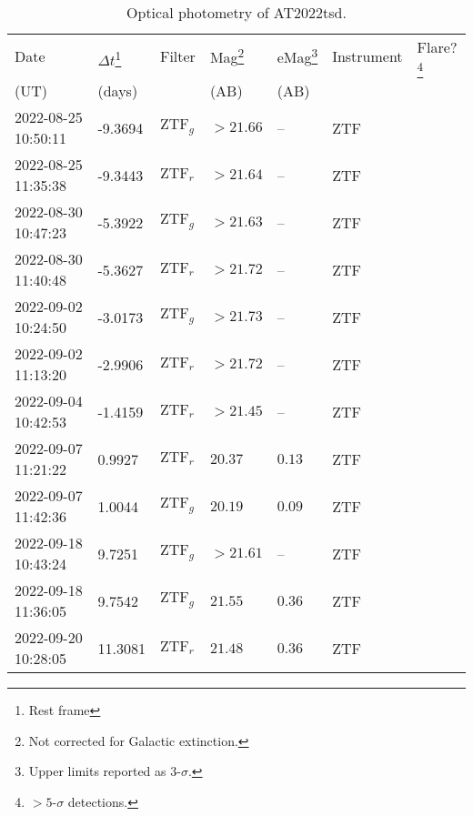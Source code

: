 \documentclass{nature_plusfigure}
\begin{document}
\begin{supplement}

\renewcommand{\thefigure}{Supplementary Information Figure~\arabic{figure}}
\renewcommand{\figurename}{}
\setcounter{figure}{0}
%


\renewcommand{\thetable}{Supplementary Information Table~\arabic{table}}
 \renewcommand{\tablename}{}
\setcounter{table}{0}

\begin{center} 
\begin{longtable}{lllllll} 
\caption{Optical photometry of AT2022tsd.} 
\label{tab:optical-photometry}\\ 
\hline\hline
Date & $\Delta t$\footnote{Rest frame} & Filter & Mag\footnote{Not corrected for Galactic extinction.} & eMag\footnote{Upper limits reported as 3-$\sigma$.} & Instrument & Flare?\footnote{$>5$-$\sigma$ detections.}\\ 
(UT) & (days) &  & (AB) & (AB) &  & \\ 
\hline
2022-08-25 10:50:11 & -9.3694 & $\mathrm{ZTF}_{g}$ & $>21.66$ & -- & ZTF &  \\ 
2022-08-25 11:35:38 & -9.3443 & $\mathrm{ZTF}_{r}$ & $>21.64$ & -- & ZTF &  \\ 
2022-08-30 10:47:23 & -5.3922 & $\mathrm{ZTF}_{g}$ & $>21.63$ & -- & ZTF &  \\ 
2022-08-30 11:40:48 & -5.3627 & $\mathrm{ZTF}_{r}$ & $>21.72$ & -- & ZTF &  \\ 
2022-09-02 10:24:50 & -3.0173 & $\mathrm{ZTF}_{g}$ & $>21.73$ & -- & ZTF &  \\ 
2022-09-02 11:13:20 & -2.9906 & $\mathrm{ZTF}_{r}$ & $>21.72$ & -- & ZTF &  \\ 
2022-09-04 10:42:53 & -1.4159 & $\mathrm{ZTF}_{r}$ & $>21.45$ & -- & ZTF &  \\ 
2022-09-07 11:21:22 & 0.9927 & $\mathrm{ZTF}_{r}$ & $20.37$ & $0.13$ & ZTF &  \\ 
2022-09-07 11:42:36 & 1.0044 & $\mathrm{ZTF}_{g}$ & $20.19$ & $0.09$ & ZTF &  \\ 
2022-09-18 10:43:24 & 9.7251 & $\mathrm{ZTF}_{g}$ & $>21.61$ & -- & ZTF &  \\ 
2022-09-18 11:36:05 & 9.7542 & $\mathrm{ZTF}_{g}$ & $21.55$ & $0.36$ & ZTF &  \\ 
2022-09-20 10:28:05 & 11.3081 & $\mathrm{ZTF}_{r}$ & $21.48$ & $0.36$ & ZTF &  \\ 

\end{longtable}
\end{center}
\end{supplement}
\end{document}
